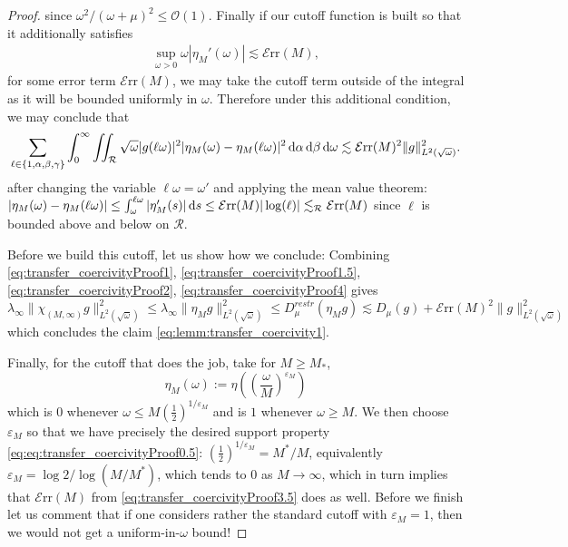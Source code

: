 \documentclass[reqno,11pt,letterpaper]{amsart}
\numberwithin{equation}{section}
\let\epsilon=\varepsilon %
\newcommand{\dd}{\, {\rm d}}
\begin{document}
\begin{proof}
    since $\omega^2/(\omega+\mu)^2 \leq \mathcal{O}(1)$. 
    Finally if our cutoff function is built so that it additionally satisfies 
     \begin{align} \label{eq:transfer_coercivityProof3.5}
     \sup_{\omega>0} \omega |\eta_M'(\omega)| \lesssim \mathcal{E}\text{rr}(M), 
     \end{align}
     for some error term $\mathcal{E}\text{rr}(M)$, we may take the cutoff term outside of the integral as it will be bounded uniformly in $\omega$. Therefore under this additional condition, we may conclude that 
     \begin{align} \label{eq:transfer_coercivityProof4}
     \sum_{\ell \in \{1,\alpha, \beta, \gamma\}} \int_0^\infty \iint_{\mathcal{R}} \sqrt{\omega}|g (\ell\omega)|^2|\eta_M (\omega) - \eta_M(\ell\omega) |^2 \dd\alpha\dd\beta \dd\omega \lesssim \mathcal{E}\text{rr}(M)^2 \|g\|_{L^2(\sqrt{\omega})}^2.
     \end{align}
     after changing the variable $\ell\omega = \omega'$ and applying the mean value theorem: $| \eta_M (\omega) - \eta_M(\ell\omega)|\leq \int_{\omega}^{\ell\omega}| \eta_M'(s)| \dd s\leq \mathcal{E}\text{rr}(M) |\log (\ell)| \lesssim_{\mathcal{R}} \mathcal{E}\text{rr}(M)$ since $\ell$ is bounded above and below on $\mathcal{R}$.  
     
     Before we build this cutoff, let us show how we conclude: Combining \eqref{eq:transfer_coercivityProof1}, \eqref{eq:transfer_coercivityProof1.5}, \eqref{eq:transfer_coercivityProof2}, \eqref{eq:transfer_coercivityProof4} gives 
     $$ \lambda_\infty  \|\chi_{(M,\infty)}g\|_{L^2(\sqrt{\omega})}^2 \leq  \lambda_\infty \|\eta_M g\|_{L^2(\sqrt{\omega})}^2 \leq  D_\mu^{restr}(\eta_M g) \lesssim D_\mu(g) + \mathcal{E}\text{rr}(M)^2 \|g\|_{L^2(\sqrt{\omega})}^2$$
     which concludes the claim \eqref{eq:lemm:transfer_coercivity1}. 
     
     Finally, for the cutoff that does the job, take for $M\geq M_*$,  $$\eta_M(\omega) := \eta \left( \left(\frac{\omega}{M}\right)^{\epsilon_M} \right) $$
     which is $0$ whenever $\omega \leq M \left( \frac{1}{2} \right)^{1/\varepsilon_M}$ and is $1$ whenever $\omega\geq M$.  We then choose $\varepsilon_M$ so that we have precisely the desired support property \eqref{eq:eq:transfer_coercivityProof0.5}: $\left( \frac{1}{2} \right)^{1/\varepsilon_M} = M^*/M$, equivalently $ \varepsilon_M = \log2/\log(M/M^*)$, which tends to $0$ as $M \to \infty$, which in turn implies that $\mathcal{E}\text{rr}(M)$ from \eqref{eq:transfer_coercivityProof3.5} does as well.
     Before we finish let us comment that if one considers rather the standard cutoff with $\varepsilon_M=1$, then we would not get a uniform-in-$\omega$ bound! 
\end{proof}
\end{document}
